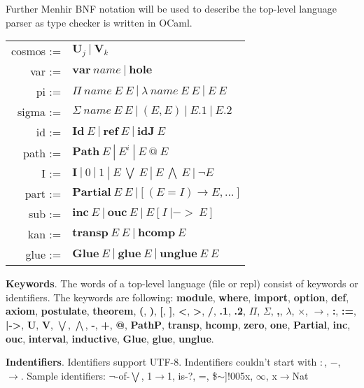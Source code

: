 \documentclass[a4paper,UKenglish,cleveref, autoref, thm-restate]{lipics-v2021}
\begin{document}
Further Menhir BNF notation will be used to describe the top-level language parser as type checker is written in OCaml.

\begin{table}[ht]
\begin{tabular}{rl}
 cosmos :=&$\mathbf{U}_j \ |\ \mathbf{V}_k$ \\
    var :=&$\mathbf{var}\ name\ |\ \mathbf{hole}$ \\
     pi :=&$\Pi\ name\ E\ E\ |\ \lambda\ name\ E\ E\ |\ E\ E$ \\
  sigma :=&$\Sigma\ name\ E\ E\ |\ (E,E)\ |\ E.1\ |\ E.2$ \\
     id :=&$\mathbf{Id}\ E\ |\ \mathbf{ref}\ E\ |\ \mathbf{idJ}\ E$ \\
   path :=&$\mathbf{Path}\ E\ |\ E^i\ |\ E\ @\ E$ \\
      I :=&$\mathbf{I}\ |\ 0\ |\ 1\ |\ E\ \bigvee\ E\ |\ E\ \bigwedge\ E\ |\ \neg E$ \\
   part :=&$\mathbf{Partial}\ E\ E\ |\ \mathbf{[}\ (E=I) \rightarrow E, ...\ \mathbf{]}$ \\
    sub :=&$\mathbf{inc}\ E\ |\ \mathbf{ouc}\ E\ |\ E\ \mathbf{[}\ I\ |->\ E\ \mathbf{]}$ \\
    kan :=&$\mathbf{transp}\ E\ E\ |\ \mathbf{hcomp}\ E$ \\
   glue :=&$\mathbf{Glue}\ E\ |\ \mathbf{glue}\ E\ |\ \mathbf{unglue}\ E\ E$ \\
\end{tabular}
\end{table}

\newpage

\textbf{Keywords}. The words of a top-level language (file or repl) consist of keywords or identifiers.
The keywords are following: \textbf{module}, \textbf{where}, \textbf{import}, \textbf{option}, \textbf{def}, \textbf{axiom},
\textbf{postulate}, \textbf{theorem}, \textbf{(}, \textbf{)}, \textbf{[}, \textbf{]}, \textbf{<}, \textbf{>},
\textbf{/}, \textbf{.1}, \textbf{.2}, \textbf{$\Pi$}, \textbf{$\Sigma$}, \textbf{,}, \textbf{$\lambda$}, \textbf{$\times$}, \textbf{$\rightarrow$}, \textbf{:}, \textbf{:=},
\textbf{|->}, \textbf{U}, \textbf{V}, \textbf{$\bigvee$}, \textbf{$\bigwedge$}, \textbf{-}, \textbf{+}, \textbf{@}, \textbf{PathP},
\textbf{transp}, \textbf{hcomp}, \textbf{zero}, \textbf{one}, \textbf{Partial}, \textbf{inc},
\textbf{ouc}, \textbf{interval}, \textbf{inductive}, \textbf{Glue}, \textbf{glue}, \textbf{unglue}.

\textbf{Indentifiers}. Identifiers support UTF-8. Indentifiers couldn't start with $:$, $-$, $\rightarrow$. Sample identifiers:
$\neg$-of-$\bigvee$, 1$\rightarrow$1, is-?, =, \$$\sim$]!005x, $\infty$, x$\rightarrow$Nat
\end{document}

